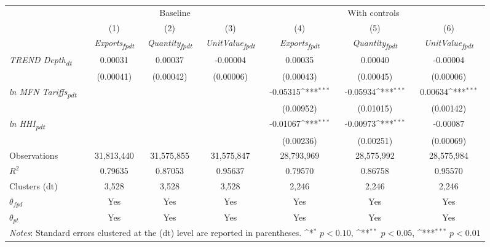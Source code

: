 {
\def\sym#1{\ifmmode^{#1}\else\(^{#1}\)\fi}
\begin{tabular}{l*{6}{c}}
\toprule
&\multicolumn{3}{c}{Baseline}&\multicolumn{3}{c}{With controls}\\\cmidrule(lr){2-4}\cmidrule(lr){5-7}
&(1)&(2)&(3)&(4)&(5)&(6)\\
&\textit{Exports\textsubscript{fpdt}}&\textit{Quantity\textsubscript{fpdt}}&\textit{UnitValue\textsubscript{fpdt}}&\textit{Exports\textsubscript{fpdt}}&\textit{Quantity\textsubscript{fpdt}}&\textit{UnitValue\textsubscript{fpdt}}\\
\midrule
\textit{TREND Depth\textsubscript{dt}} & 0.00031 & 0.00037 & -0.00004 & 0.00035 & 0.00040 & -0.00004\\
 & (0.00041) & (0.00042) & (0.00006) & (0.00043) & (0.00045) & (0.00006)\\
\addlinespace
\textit{ln MFN Tariffs\textsubscript{pdt}} &  &  &  & -0.05315\sym{***} & -0.05934\sym{***} & 0.00634\sym{***}\\
 &  &  &  & (0.00952) & (0.01015) & (0.00142)\\
\addlinespace
\textit{ln HHI\textsubscript{pdt}} &  &  &  & -0.01067\sym{***} & -0.00973\sym{***} & -0.00087\\
 &  &  &  & (0.00236) & (0.00251) & (0.00069)\\
\midrule
Observations & 31,813,440 & 31,575,855 & 31,575,847 & 28,793,969 & 28,575,992 & 28,575,984\\
$R^{2}$ & 0.79635 & 0.87053 & 0.95637 & 0.79570 & 0.86758 & 0.95570\\
Clusters (dt) & 3,528 & 3,528 & 3,528 & 2,246 & 2,246 & 2,246\\
$\theta_{fpd}$ & Yes & Yes & Yes & Yes & Yes & Yes\\
$\theta_{pt}$ & Yes & Yes & Yes & Yes & Yes & Yes\\
\bottomrule
\multicolumn{7}{l}{\footnotesize \textit{Notes}: Standard errors clustered at the (dt) level are reported in parentheses. \sym{*} \(p<0.10\), \sym{**} \(p<0.05\), \sym{***} \(p<0.01\)}\\
\end{tabular}
}
